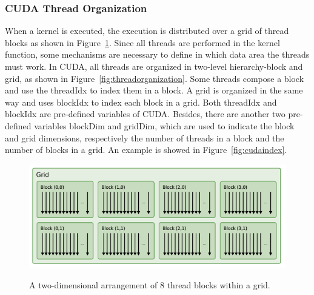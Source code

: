 \documentclass[Ingles]{ic-tese-v1}
\newcommand{\rfig}[1]{Figure~\ref{fig:#1}}
\begin{document}
\subsubsection{CUDA Thread Organization}
\label{CUDA Thread Organization}
When a kernel is executed, the execution is distributed over a grid of thread
blocks as shown in \rfig{threadsblocks}. Since all threads are performed in the
kernel function, some mechanisms are necessary to define in which data area the
threads must work. In CUDA, all threads are organized in two-level
hierarchy-block and grid, as shown in \rfig{threadorganization}. Some
threads compose a block and use the threadIdx to index them in a block. A grid
is organized in the same way and uses blockIdx to index each block in a grid.
Both threadIdx and blockIdx are pre-defined variables of CUDA. Besides,
there are another two pre-defined variables blockDim and gridDim, which are
used to indicate the block and grid dimensions, respectively the number of threads in a block and the number of blocks in a grid. An example is showed in \rfig{cudaindex}.

\begin{figure}[t]
	\centering
	\caption{A two-dimensional arrangement of 8 thread blocks within a grid.}
	\includegraphics[scale=0.75]{images/threadsblock.png}
	\label{fig:threadsblocks}
\end{figure}
\end{document}
